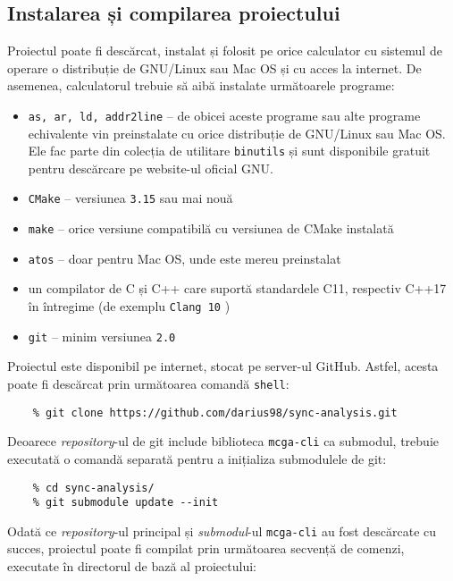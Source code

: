 \subsection{Instalarea și compilarea proiectului}
Proiectul poate fi descărcat, instalat și folosit pe orice calculator cu
sistemul de operare o distribuție de GNU/Linux sau Mac OS și cu acces
la internet. De asemenea, calculatorul trebuie să aibă instalate
următoarele programe:
\begin{itemize}
    \item \lstinline{as, ar, ld, addr2line} -- de obicei aceste programe
    sau alte programe echivalente vin preinstalate cu orice distribuție
    de GNU/Linux sau Mac OS. Ele fac parte din colecția de utilitare
    \lstinline{binutils}\cite{binutils} și sunt disponibile gratuit
    pentru descărcare pe website-ul oficial GNU\cite{GNUWebsite}.
    \item \lstinline{CMake}\cite{CMake} -- versiunea \lstinline{3.15}
    sau mai nouă
    \item \lstinline{make} -- orice versiune compatibilă cu versiunea de
    CMake instalată
    \item \lstinline{atos}\cite{atos} -- doar pentru Mac OS, unde este
    mereu preinstalat
    \item un compilator de C și C++ care suportă standardele C11,
    respectiv C++17 în întregime (de exemplu \lstinline{Clang 10}
    \cite{Clang})
    \item \lstinline{git}\cite{git} -- minim versiunea \lstinline{2.0}
\end{itemize}

Proiectul este disponibil pe internet, stocat pe server-ul GitHub.
Astfel, acesta poate fi descărcat prin următoarea comandă
\lstinline{shell}:

\begin{lstlisting}
    % git clone https://github.com/darius98/sync-analysis.git
\end{lstlisting}

Deoarece \textit{repository}-ul de git include biblioteca
\lstinline{mcga-cli}\cite{mcga-cli} ca submodul, trebuie executată o
comandă separată pentru a inițializa submodulele de git:

\begin{lstlisting}
    % cd sync-analysis/
    % git submodule update --init
\end{lstlisting}

Odată ce \textit{repository}-ul principal și \textit{submodul}-ul
\lstinline{mcga-cli} au fost descărcate cu succes, proiectul poate fi
compilat prin următoarea secvență de comenzi, executate în directorul de
bază al proiectului:

